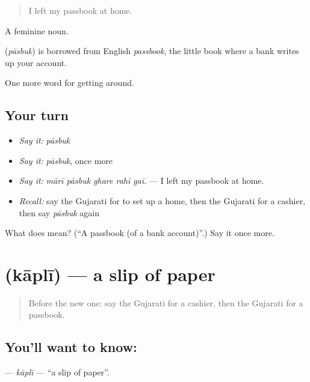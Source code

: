 \begin{quote}
I left my passbook at home.
\end{quote}

A feminine noun.

\begin{cousinweb}
\textbf{} (\emph{pāsbuk}) is borrowed from English \emph{passbook}, the little book where a bank writes up your account.
\end{cousinweb}

\begin{grammarlens}[title={What you've built}]
One more word for getting around.
\end{grammarlens}

\subsection*{Your turn}
\begin{itemize}
\raggedright
  \item \emph{Say it:} \emph{pāsbuk}
  \item \emph{Say it:} \emph{pāsbuk}, once more
  \item \emph{Say it:} \emph{mārī pāsbuk ghare rahī gaī.} — I left my passbook at home.
  \item \emph{Recall:} say the Gujarati for to set up a home, then the Gujarati for a cashier, then say \emph{pāsbuk} again
\end{itemize}

\begin{tcolorbox}[breakable,colback=teal!4,colframe=teal!35!black,title={Before you move on}]
What does  mean? (\textquotedblleft{}A passbook (of a bank account)\textquotedblright{}.) Say it once more.
\end{tcolorbox}
\section[\texorpdfstring{\gu{કાપલી} (kāplī)}{કાપલી (kāplī)}]{ (kāplī) — a slip of paper}

\label{lesson:GU-C424-kapli}



\begin{quote}
Before the new one: say the Gujarati for a cashier, then the Gujarati for a passbook.
\end{quote}

\subsection*{You'll want to know: }
\textbf{} — \emph{kāplī} — \textquotedblleft{}a slip of paper\textquotedblright{}.

